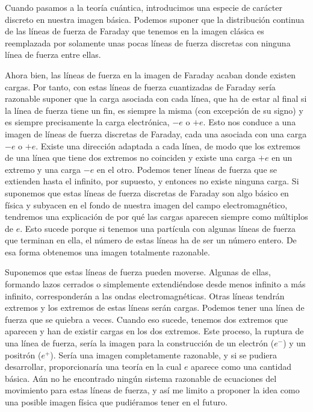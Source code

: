 \documentclass[a4paper, 12pt]{article}
\begin{document}
Cuando pasamos a la teoría cuántica, introducimos una especie de carác\-ter discreto en nuestra imagen básica. Podemos suponer que la distribución continua de las líneas de fuerza de Faraday que tenemos en la imagen clásica es reemplazada por solamente unas pocas líneas de fuerza discretas con ninguna línea de fuerza entre ellas.

Ahora bien, las líneas de fuerza en la imagen de Faraday acaban donde existen cargas. Por tanto, con estas líneas de fuerza cuantizadas de Faraday sería razonable suponer que la carga asociada con cada línea, que ha de estar al final si la línea de fuerza tiene un fin, es siempre la misma (con excepción de su signo) y es siempre precisamente la carga electrónica, $- e$ o $+e$. Esto nos conduce a una imagen de líneas de fuerza discretas de Faraday, cada una asociada con una carga $- e$ o $+ e$. Existe una dirección adaptada a cada línea, de modo que los extremos de una línea que tiene dos extremos no coinciden y existe una carga $+ e$ en un extremo y una carga $- e$ en el otro. Podemos tener líneas de fuerza que se extienden hasta el infinito, por supuesto, y entonces no existe ninguna carga.
Si suponemos que estas líneas de fuerza discretas de Faraday son algo básico en física y subyacen en el fondo de nuestra imagen del campo electromagnético, tendremos una explicación de por qué las cargas aparecen siempre como múltiplos de $e$. Esto sucede porque si tenemos una partícula con algunas líneas de fuerza que terminan en ella, el número de estas líneas ha de ser un número entero. De esa forma obtenemos una imagen totalmente razonable.

Suponemos que estas líneas de fuerza pueden moverse. Algunas de ellas, formando lazos cerrados o simplemente extendiéndose desde menos infinito a más infinito, corresponderán a las ondas electromagnéticas. Otras líneas tendrán extremos y los extremos de estas líneas serán cargas. Podemos tener una línea de fuerza que se quiebra a veces. Cuando eso sucede, tenemos dos extremos que aparecen y han de existir cargas en los dos extremos. Este proceso, la ruptura de una línea de fuerza, sería la imagen para la construcción de un electrón ($e^-$) y un positrón ($e^+$). Sería una imagen completamente razonable, y si se pudiera desarrollar, proporcionaría una teoría en la cual $e$ aparece como una cantidad básica. Aún no he encontrado ningún sistema razonable de ecuaciones del movimiento para estas líneas de fuerza, y así me limito a proponer la idea como una posible imagen  física que pudiéramos tener en el futuro.
\end{document}
